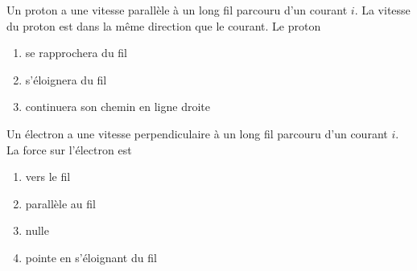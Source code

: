 \begin{diapobox}
  Un proton a une vitesse parallèle à un long fil parcouru d'un courant $i$. La
  vitesse du proton est dans la même direction que le courant.
  Le proton 
  \begin{enumerate}
    \item se rapprochera du fil
    \item s'éloignera du fil
    \item continuera son chemin en ligne droite
  \end{enumerate}
\end{diapobox}

\begin{diapobox}
  Un électron a une vitesse perpendiculaire à un long fil parcouru d'un courant
  $i$. La force sur l'électron est 
  \begin{enumerate}
    \item vers le fil
    \item parallèle au fil
    \item nulle
    \item pointe en s'éloignant du fil
  \end{enumerate}
\end{diapobox}



